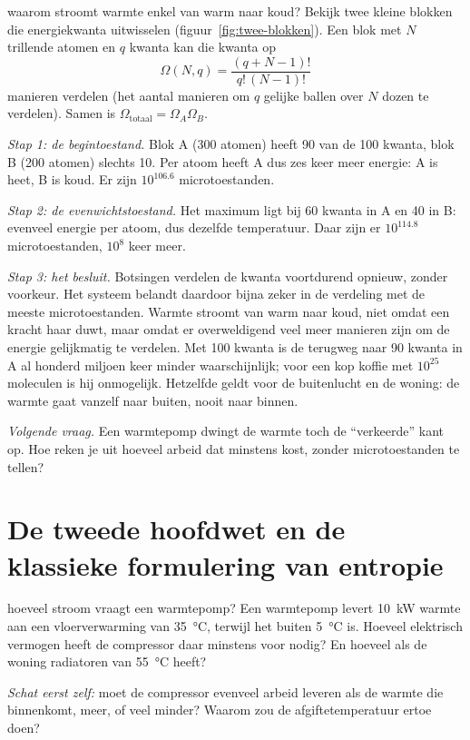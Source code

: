 \begin{casusuitgewerkt}{waarom stroomt warmte enkel van warm naar koud?}
Bekijk twee kleine blokken die energiekwanta uitwisselen (figuur~\ref{fig:twee-blokken}). Een blok met $N$ trillende atomen en $q$ kwanta kan die kwanta op
\[
\Omega(N,q) = \frac{(q+N-1)!}{q!\,(N-1)!}
\]
manieren verdelen (het aantal manieren om $q$ gelijke ballen over $N$ dozen te verdelen). Samen is $\Omega_\text{totaal} = \Omega_A\Omega_B$.

\emph{Stap 1: de begintoestand.} Blok A (300 atomen) heeft 90 van de 100 kwanta, blok B (200 atomen) slechts 10. Per atoom heeft A dus zes keer meer energie: A is heet, B is koud. Er zijn $10^{106.6}$ microtoestanden.

\emph{Stap 2: de evenwichtstoestand.} Het maximum ligt bij 60 kwanta in A en 40 in B: evenveel energie per atoom, dus dezelfde temperatuur. Daar zijn er $10^{114.8}$ microtoestanden, $10^8$ keer meer.

\emph{Stap 3: het besluit.} Botsingen verdelen de kwanta voortdurend opnieuw, zonder voorkeur. Het systeem belandt daardoor bijna zeker in de verdeling met de meeste microtoestanden. Warmte stroomt van warm naar koud, niet omdat een kracht haar duwt, maar omdat er overweldigend veel meer manieren zijn om de energie gelijkmatig te verdelen. Met 100 kwanta is de terugweg naar 90 kwanta in A al honderd miljoen keer minder waarschijnlijk; voor een kop koffie met $10^{25}$ moleculen is hij onmogelijk. Hetzelfde geldt voor de buitenlucht en de woning: de warmte gaat vanzelf naar buiten, nooit naar binnen.

\emph{Volgende vraag.} Een warmtepomp dwingt de warmte toch de ``verkeerde'' kant op. Hoe reken je uit hoeveel arbeid dat minstens kost, zonder microtoestanden te tellen?
\end{casusuitgewerkt}

\section{De tweede hoofdwet en de klassieke formulering van entropie}
\label{sec:tweedehoofdwet}

\begin{casus}{hoeveel stroom vraagt een warmtepomp?}
Een warmtepomp levert \SI{10}{\kilo\watt} warmte aan een vloerverwarming van \SI{35}{\celsius}, terwijl het buiten \SI{5}{\celsius} is. Hoeveel elektrisch vermogen heeft de compressor daar minstens voor nodig? En hoeveel als de woning radiatoren van \SI{55}{\celsius} heeft?

\emph{Schat eerst zelf:} moet de compressor evenveel arbeid leveren als de warmte die binnenkomt, meer, of veel minder? Waarom zou de afgiftetemperatuur ertoe doen?
\end{casus}


